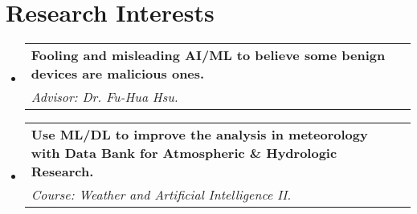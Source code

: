 \documentclass[a4paper,11pt]{article}
\makeatletter
\newcommand{\resumeSubheading}[4]{
\vspace{0.5mm}\item
    \begin{tabular*}{0.98\textwidth}[t]{l@{\extracolsep{\fill}}r}
        \textbf{#1} & \textit{\footnotesize{#4}} \\
        \textit{\footnotesize{#3}} &  \footnotesize{#2}\\
    \end{tabular*}
    \vspace{-2.4mm}
}
\newcommand{\resumeProject}[4]{
\vspace{0.5mm}\item
    \begin{tabular*}{0.98\textwidth}[t]{l@{\extracolsep{\fill}}r}
        \textbf{#1} & \textit{\footnotesize{#3}} \\
        \footnotesize{\textit{#2}} & \footnotesize{#4}
    \end{tabular*}
    \vspace{-2.4mm}
}
\newcommand{\resumeSubHeadingListStart}{\begin{itemize}[leftmargin=*,labelsep=0mm]}
\newcommand{\resumeItemListStart}{\begin{justify}\begin{itemize}[leftmargin=3ex, rightmargin=2ex, noitemsep,labelsep=1.2mm,itemsep=0mm]\small}
\newcommand{\resumeSubHeadingListEnd}{\end{itemize}\vspace{2mm}}
\newcommand{\resumeItemListEnd}{\end{itemize}\end{justify}\vspace{-2mm}}
\makeatother
\begin{document}
    
      

\section{\textbf{Research Interests}}
  \resumeSubHeadingListStart
    \resumeSubheading
      { Fooling and misleading AI/ML to believe some benign devices are malicious ones.}{}
      {Advisor: Dr. Fu-Hua Hsu.}{}
    \resumeSubheading
      { Use ML/DL to improve the analysis in meteorology with Data Bank for Atmospheric \& Hydrologic Research.}{}
      {Course: Weather and Artificial Intelligence II.}{}

  \resumeSubHeadingListEnd
  


    
\end{document}
